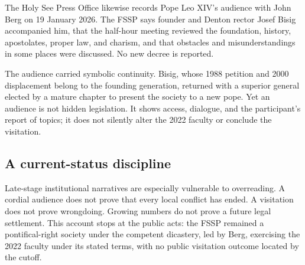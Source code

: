 The Holy See Press Office likewise records Pope Leo XIV's audience with John Berg on 19 January 2026. The FSSP says founder and Denton rector Josef Bisig accompanied him, that the half-hour meeting reviewed the foundation, history, apostolates, proper law, and charism, and that obstacles and misunderstandings in some places were discussed. No new decree is reported.

The audience carried symbolic continuity. Bisig, whose 1988 petition and 2000 displacement belong to the founding generation, returned with a superior general elected by a mature chapter to present the society to a new pope. Yet an audience is not hidden legislation. It shows access, dialogue, and the participant's report of topics; it does not silently alter the 2022 faculty or conclude the visitation.

\subsection{A current-status discipline}

Late-stage institutional narratives are especially vulnerable to overreading. A cordial audience does not prove that every local conflict has ended. A visitation does not prove wrongdoing. Growing numbers do not prove a future legal settlement. This account stops at the public acts: the FSSP remained a pontifical-right society under the competent dicastery, led by Berg, exercising the 2022 faculty under its stated terms, with no public visitation outcome located by the cutoff.

